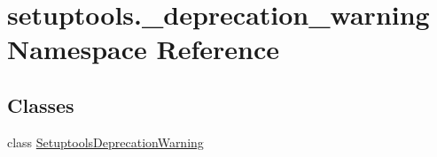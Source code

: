 \hypertarget{namespacesetuptools_1_1__deprecation__warning}{}\section{setuptools.\+\_\+deprecation\+\_\+warning Namespace Reference}
\label{namespacesetuptools_1_1__deprecation__warning}
\subsection*{Classes}
\begin{DoxyCompactItemize}
\item 
class \hyperlink{classsetuptools_1_1__deprecation__warning_1_1SetuptoolsDeprecationWarning}{Setuptools\+Deprecation\+Warning}
\end{DoxyCompactItemize}
